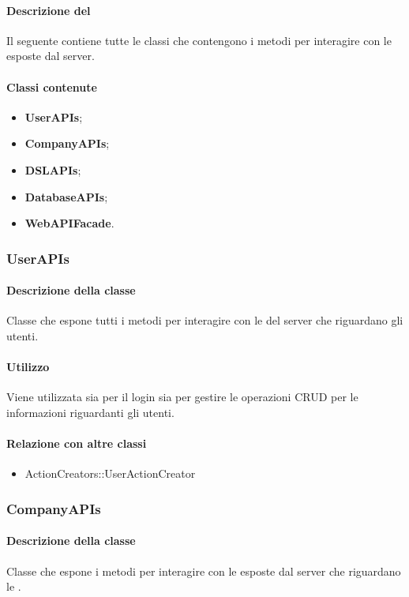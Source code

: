 \paragraph*{Descrizione del }
Il seguente  contiene tutte le classi che contengono i metodi per interagire con le  esposte dal server. 
\paragraph*{Classi contenute}
\begin{itemize}
\item \textbf{UserAPIs};
\item \textbf{CompanyAPIs};
\item \textbf{DSLAPIs};
\item \textbf{DatabaseAPIs};
\item \textbf{WebAPIFacade}.
\end{itemize}

\subsubsection{UserAPIs}
\paragraph*{Descrizione della classe}
Classe che espone tutti i metodi per interagire con le  del server che riguardano gli utenti.

\paragraph*{Utilizzo}
Viene utilizzata sia per il login sia per gestire le operazioni CRUD per le informazioni riguardanti gli utenti.

\paragraph*{Relazione con altre classi}
\begin{itemize}
\item ActionCreators::UserActionCreator
\end{itemize}

\subsubsection{CompanyAPIs}
\paragraph*{Descrizione della classe}
Classe che espone i metodi per interagire con le  esposte dal server che riguardano le .

